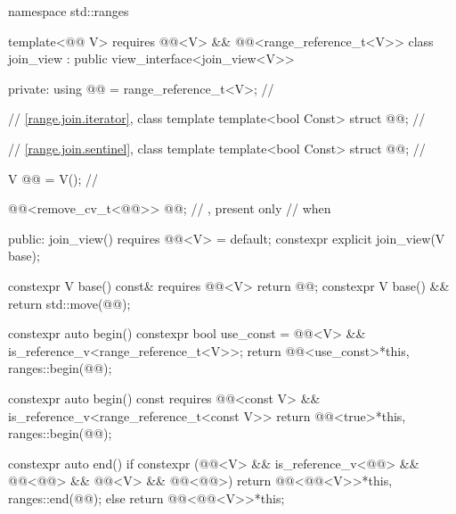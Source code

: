%
%
%
%
\begin{codeblock}
namespace std::ranges {
  template<@@ V>
    requires @@<V> && @@<range_reference_t<V>>
  class join_view : public view_interface<join_view<V>> {
  private:
    using @@ = range_reference_t<V>;                  // \expos

    // \ref{range.join.iterator}, class template 
    template<bool Const>
      struct @@;                                      // \expos

    // \ref{range.join.sentinel}, class template 
    template<bool Const>
      struct @@;                                      // \expos

    V @@ = V();                                          // \expos

    @@<remove_cv_t<@@>> @@;    // \expos, present only
                                                            // when 

  public:
    join_view() requires @@<V> = default;
    constexpr explicit join_view(V base);

    constexpr V base() const& requires @@<V> { return @@; }
    constexpr V base() && { return std::move(@@); }

    constexpr auto begin() {
      constexpr bool use_const = @@<V> &&
                                 is_reference_v<range_reference_t<V>>;
      return @@<use_const>{*this, ranges::begin(@@)};
    }

    constexpr auto begin() const
    requires @@<const V> &&
             is_reference_v<range_reference_t<const V>> {
      return @@<true>{*this, ranges::begin(@@)};
    }

    constexpr auto end() {
      if constexpr (@@<V> &&
                    is_reference_v<@@> && @@<@@> &&
                    @@<V> && @@<@@>)
        return @@<@@<V>>{*this, ranges::end(@@)};
      else
        return @@<@@<V>>{*this};
    }

}}
\end{codeblock}
